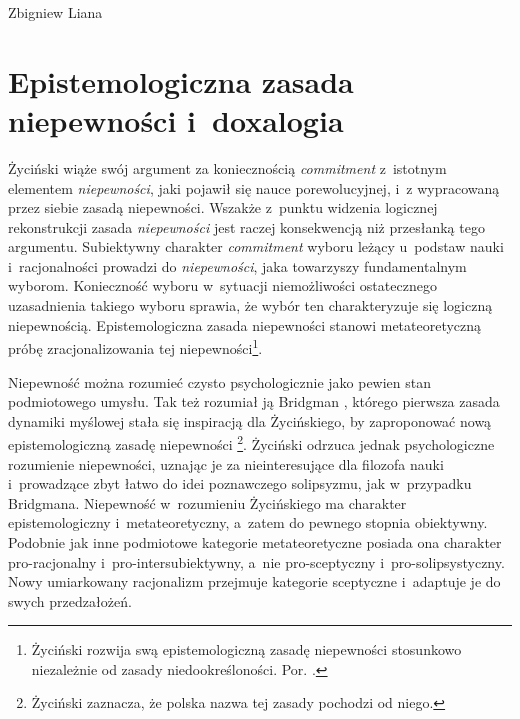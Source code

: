 \begin{artplenv}{Zbigniew Liana}
\section{Epistemologiczna zasada niepewności i~doxalogia}
Życiński wiąże swój argument za koniecznością \textit{commitment} z~istotnym elementem \textit{niepewności}, jaki pojawił się nauce porewolucyjnej, i~z wypracowaną przez siebie zasadą niepewności. Wszakże z~punktu widzenia logicznej rekonstrukcji zasada \textit{niepewności} jest raczej konsekwencją niż przesłanką tego argumentu. Subiektywny charakter \textit{commitment} wyboru leżący u~podstaw nauki i~racjonalności prowadzi do \textit{niepewności}, jaka towarzyszy fundamentalnym wyborom. Konieczność wyboru w~sytuacji niemożliwości ostatecznego uzasadnienia takiego wyboru sprawia, że wybór ten charakteryzuje się logiczną niepewnością. Epistemologiczna zasada niepewności stanowi metateoretyczną próbę zracjonalizowania tej niepewności\footnote{Życiński rozwija swą epistemologiczną zasadę niepewności stosunkowo niezależnie od zasady niedookreśloności. Por.
\parencites[][s.~145]{zycinski_structure_1988}[][s.~256]{zycinski_struktura_2013_liana}.%
}.

Niepewność można rozumieć czysto psychologicznie jako pewien stan podmiotowego umysłu. Tak też rozumiał ją Bridgman
\parencite*[][]{bridgman_reflections_1950}, %
 którego pierwsza zasada dynamiki myślowej stała się inspiracją dla Życińskiego, by zaproponować nową epistemologiczną zasadę niepewności 
\parencites[][s.~158–161]{zycinski_teizm_1985}[][s.~137–139]{zycinski_structure_1988}[][s.~243–247]{zycinski_struktura_2013_liana}%
\footnote{Życiński 
\parencite*[][s.~159 przypis 78]{zycinski_teizm_1985} %
 zaznacza, że polska nazwa tej zasady pochodzi od niego.}. Życiński odrzuca jednak psychologiczne rozumienie niepewności, uznając je za nieinteresujące dla filozofa nauki i~prowadzące zbyt łatwo do idei poznawczego solipsyzmu, jak w~przypadku Bridgmana. Niepewność w~rozumieniu Życińskiego ma charakter epistemologiczny i~metateoretyczny, a~zatem do pewnego stopnia obiektywny. Podobnie jak inne podmiotowe kategorie metateoretyczne posiada ona charakter pro-racjonalny i~pro-intersubiektywny, a~nie pro-sceptyczny i~pro-solipsystyczny. Nowy umiarkowany racjonalizm przejmuje kategorie sceptyczne i~adaptuje je do swych przedzałożeń.


\end{artplenv}
